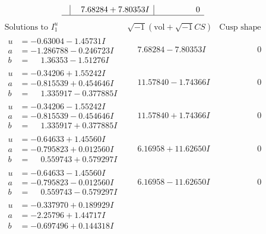 \documentclass[1p]{elsarticle_modified}
\theoremstyle{definition}
\newcommand{\I}{\sqrt{-1}}
\begin{document}
$$\begin{array}{c|c|c}
 & \phantom{-}7.68284 + 7.80353 I & \phantom{-0.000000 } 0\\
 \hline 
 \end{array}$$\newpage$$\begin{array}{c|c|c}  
\text{Solutions to }I^u_{1}& \I (\text{vol} + \sqrt{-1}CS) & \text{Cusp shape}\\
 \hline 
\begin{aligned}
u &= -0.63004 - 1.45731 I \\
a &= -1.286788 - 0.246723 I \\
b &= \phantom{-}1.36353 - 1.51276 I\end{aligned}
 & \phantom{-}7.68284 - 7.80353 I & \phantom{-0.000000 } 0 \\ \hline\begin{aligned}
u &= -0.34206 + 1.55242 I \\
a &= -0.815539 + 0.454646 I \\
b &= \phantom{-}1.335917 - 0.377885 I\end{aligned}
 & \phantom{-}11.57840 - 1.74366 I & \phantom{-0.000000 } 0 \\ \hline\begin{aligned}
u &= -0.34206 - 1.55242 I \\
a &= -0.815539 - 0.454646 I \\
b &= \phantom{-}1.335917 + 0.377885 I\end{aligned}
 & \phantom{-}11.57840 + 1.74366 I & \phantom{-0.000000 } 0 \\ \hline\begin{aligned}
u &= -0.64633 + 1.45560 I \\
a &= -0.795823 + 0.012560 I \\
b &= \phantom{-}0.559743 + 0.579297 I\end{aligned}
 & \phantom{-}6.16958 + 11.62650 I & \phantom{-0.000000 } 0 \\ \hline\begin{aligned}
u &= -0.64633 - 1.45560 I \\
a &= -0.795823 - 0.012560 I \\
b &= \phantom{-}0.559743 - 0.579297 I\end{aligned}
 & \phantom{-}6.16958 - 11.62650 I & \phantom{-0.000000 } 0 \\ \hline\begin{aligned}
u &= -0.337970 + 0.189929 I \\
a &= -2.25796 + 1.44717 I \\
b &= -0.697496 + 0.144318 I\end{aligned}

\end{array}$$
\end{document}

